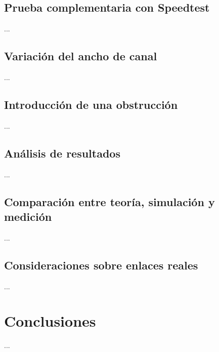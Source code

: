 \subsection{Prueba complementaria con Speedtest}
\label{sec_3.9}
...



\subsection{Variación del ancho de canal}
\label{sec_3.10}
...



\subsection{Introducción de una obstrucción}
\label{sec_3.11}
...



\subsection{Análisis de resultados}
\label{sec_3.12}
...



\subsection{Comparación entre teoría, simulación y medición}
\label{sec_3.13}
...



\subsection{Consideraciones sobre enlaces reales}
\label{sec_3.14}
...






\section{Conclusiones}
\label{sec_4}
...
